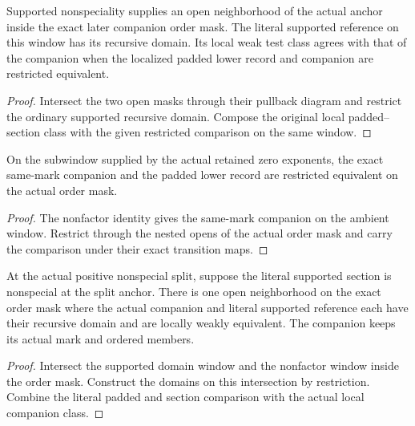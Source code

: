 \begin{theorem}
\label{hir:g1-later-supported-exact-order-window}
\leanok
Supported nonspeciality supplies an open neighborhood of the
actual anchor inside the exact later companion order mask. The
literal supported reference on this window has its recursive
domain. Its local weak test class agrees with that of the
companion when the localized padded lower record and companion
are restricted equivalent.
\end{theorem}
\begin{proof}
Intersect the two open masks through their pullback diagram
and restrict the ordinary supported recursive domain. Compose
the original local padded--section class with the given
restricted comparison on the same window.
\end{proof}

\begin{theorem}
\label{hir:g1-later-order-nonfactor-window}
\leanok
On the subwindow supplied by the actual retained zero
exponents, the exact same-mark companion and the padded
lower record are restricted equivalent on the actual
order mask.
\end{theorem}
\begin{proof}
The nonfactor identity gives the same-mark companion on
the ambient window. Restrict through the nested opens
of the actual order mask and carry the comparison under
their exact transition maps.
\end{proof}

\begin{theorem}
\label{hir:g1-actual-later-common-supported-reference}
\leanok
At the actual positive nonspecial split, suppose the literal
supported section is nonspecial at the split anchor. There is
one open neighborhood on the exact order mask where the
actual companion and literal supported reference each have
their recursive domain and are locally weakly equivalent.
The companion keeps its actual mark and ordered members.
\end{theorem}
\begin{proof}
Intersect the supported domain window and the nonfactor
window inside the order mask. Construct the domains on this
intersection by restriction. Combine the literal padded and
section comparison with the actual local companion class.
\end{proof}

